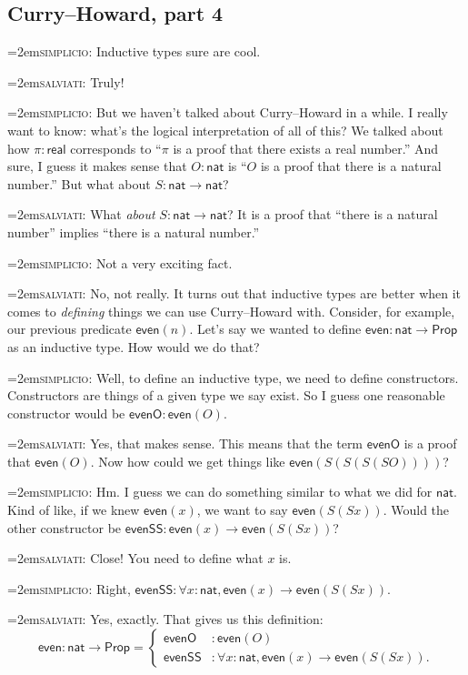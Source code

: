 \documentclass[11pt,paper=letter]{scrartcl}
\newcommand{\sf}{\mathsf}
\newcommand{\simp}{\vspace{0.5em}\noindent\hangindent=2em\textsc{simplicio:} }
\newcommand{\salv}{\vspace{0.5em}\noindent\hangindent=2em\textsc{salviati:} }
\newcommand{\prop}{\mathsf{Prop}}
\begin{document}
\subsection{Curry--Howard, part 4}

\simp Inductive types sure are cool.

\salv Truly!

\simp But we haven't talked about Curry--Howard in a while. I really want to know: what's the logical interpretation of all of this? We talked about how $\pi : \sf{real}$ corresponds to ``$\pi$ is a proof that there exists a real number.'' And sure, I guess it makes sense that $O: \sf{nat}$ is ``$O$ is a proof that there is a natural number.'' But what about $S: \sf{nat} \to \sf{nat}$?

\salv What \emph{about} $S : \sf{nat} \to \sf{nat}$? It is a proof that ``there is a natural number'' implies ``there is a natural number.''

\simp Not a very exciting fact.

\salv No, not really. It turns out that inductive types are better when it comes to \emph{defining} things we can use Curry--Howard with. Consider, for example, our previous predicate $\sf{even}(n)$. Let's say we wanted to define $\sf{even} : \sf{nat} \to \prop$ as an inductive type. How would we do that?

\simp Well, to define an inductive type, we need to define constructors. Constructors are things of a given type we say exist. So I guess one reasonable constructor would be $\sf{evenO}: \sf{even}(O)$.

\salv Yes, that makes sense. This means that the term $\sf{evenO}$ is a proof that $\sf{even}(O)$. Now how could we get things like $\sf{even}(S(S(S(SO))))$?

\simp Hm. I guess we can do something similar to what we did for $\sf{nat}$. Kind of like, if we knew $\sf{even}(x)$, we want to say $\sf{even}(S(Sx))$. Would the other constructor be $\sf{evenSS}: \sf{even}(x) \to \sf{even}(S(Sx))$?

\salv Close! You need to define what $x$ is.

\simp Right, $\sf{evenSS}: \forall x: \sf{nat}, \sf{even}(x) \to \sf{even}(S(Sx))$.

\salv Yes, exactly. That gives us this definition:\[
  \sf{even} : \sf{nat} \to \prop = \begin{cases}
    \sf{evenO} &: \sf{even}(O) \\
    \sf{evenSS} &: \forall x: \sf{nat}, \sf{even}(x) \to \sf{even}(S(Sx)).
  \end{cases}
\]
\end{document}
